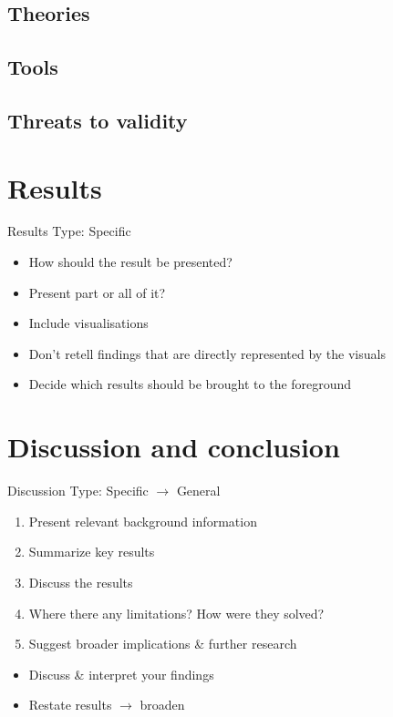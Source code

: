 \documentclass[a4paper,11pt]{article}
\newcounter{counterTODO}\setcounter{counterTODO}{1}
\newcounter{counterTODOMaybe}\setcounter{counterTODOMaybe}{1}
\newcommand\TODO[2][]{%
  \ifshowTodo{%
    \def\varTODOtext{\textcolor{purple}{\texttt{<}\textbf{TODO}\#\arabic{counterTODO}\texttt{: #2>}}}
    \def\varTODOContentLine{\textcolor{purple}{#2}}
    \ifthenelse{\isempty{#1}}%
      {%
        \addcontentsline{tocTODO}{section}{\vspace{-0.3cm}\varTODOContentLine}%
        \varTODOtext\\%
      }%
      {%
        \addcontentsline{tocTODO}{section}{\vspace{-0.3cm}\sout{\varTODOContentLine}}%
      }%
      \stepcounter{counterTODO}%
  }\fi%
}
\newcommand\TODOMaybe[1]{%
  \ifshowTodo{%
    \textcolor{orange}{%
      \texttt{<}\textbf{TODOMaybe}\#\arabic{counterTODOMaybe}\texttt{: #1?>}%
    }\\%
    \stepcounter{counterTODOMaybe}
  }\fi%
}
\newif\ifshowTodo
\begin{document}
    \TODO[]{Figure the correct word for '<this current document>'}
    \TODO[]{How is design thinking used in this <project?{>}}

  \subsection{Theories}
    \TODO[]{Finish Theories}
  \subsection{Tools}
    \TODO[]{Finish Tools}
  \subsection{Threats to validity}
    \TODO[]{Finish Threats to validity}

\section{Results}
  \begin{notes}{Results}
    Type: Specific
    \begin{itemize}
      \item{How should the result be presented?}
      \item{Present part or all of it?}
      \item{Include visualisations}
      \item{Don't retell findings that are directly represented by the visuals}
      \item{Decide which results should be brought to the foreground}
    \end{itemize}
  \end{notes}

  \TODO[]{Finish Results }
  \TODOMaybe{Flesh out more sub-sections}

\section{Discussion and conclusion}

  \begin{notes}{Discussion}
    Type: Specific $\rightarrow$ General
    \begin{enumerate}
      \item{Present relevant background information}
      \item{Summarize key results}
      \item{Discuss the results}
      \item{Where there any limitations? How were they solved?}
      \item{Suggest broader implications \& further research}
    \end{enumerate}
    \begin{itemize}
      \item{Discuss \& interpret your findings}
      \item{Restate results $\rightarrow$ broaden}
    \end{itemize}
  \end{notes}
\end{document}
